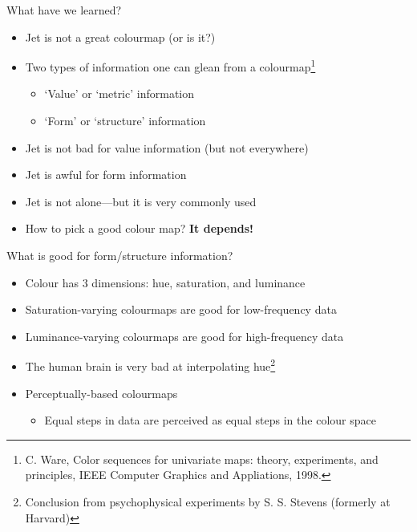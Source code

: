 \documentclass[10pt,presentation,compress]{beamer}
\begin{document}
\begin{frame}{What have we learned?}
  \begin{itemize}
    \item Jet is not a great colourmap (or is it?)
    \item Two types of information one can glean from a colourmap\footnote{C.
      Ware, Color sequences for univariate maps: theory, experiments, and
      principles, IEEE Computer Graphics and Appliations, 1998.}
      \begin{itemize}
        \item `Value' or `metric' information
        \item `Form' or `structure' information
      \end{itemize}
    \item Jet is not bad for value information (but not everywhere)
    \item Jet is awful for form information
    \item Jet is not alone---but it is very commonly used
    \item How to pick a good colour map?  \textbf{It depends!}
  \end{itemize}
\end{frame}

\begin{frame}{What is good for form/structure information?}
  \begin{itemize}
    \item Colour has 3 dimensions: hue, saturation, and luminance
    \item Saturation-varying colourmaps are good for low-frequency data
    \item Luminance-varying colourmaps are good for high-frequency data
    \item The human brain is very bad at interpolating hue\footnote{Conclusion
      from psychophysical experiments by S. S. Stevens (formerly at Harvard)}
    \item Perceptually-based colourmaps
      \begin{itemize}
        \item Equal steps in data are perceived as equal steps in the colour
          space
      \end{itemize}
  \end{itemize}
\end{frame}
\end{document}
